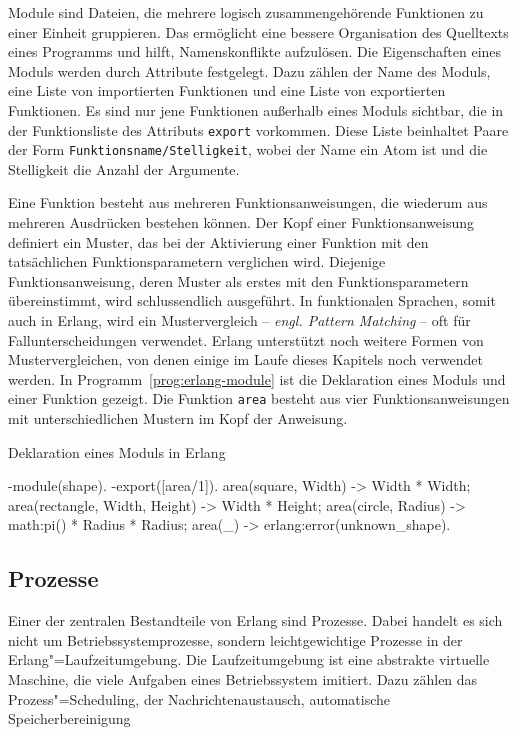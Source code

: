 Module sind Dateien, die mehrere logisch zusammengehörende Funktionen zu einer Einheit gruppieren. Das ermöglicht eine bessere Organisation des Quelltexts eines Programms und hilft, Namenskonflikte aufzulösen. Die Eigenschaften eines Moduls werden durch Attribute festgelegt. Dazu zählen \zB der Name des Moduls, eine Liste von importierten Funktionen und eine Liste von exportierten Funktionen. Es sind nur jene Funktionen außerhalb eines Moduls sichtbar, die in der Funktionsliste des Attributs \lstinline{export} vorkommen. Diese Liste beinhaltet Paare der Form \lstinline{Funktionsname/Stelligkeit}, wobei der Name ein Atom ist und die Stelligkeit die Anzahl der Argumente.

Eine Funktion besteht aus mehreren Funktionsanweisungen, die wiederum aus mehreren Ausdrücken bestehen können. Der Kopf einer Funktionsanweisung definiert ein Muster, das bei der Aktivierung einer Funktion mit den tatsächlichen Funktionsparametern verglichen wird. Diejenige Funktionsanweisung, deren Muster als erstes mit den Funktionsparametern übereinstimmt, wird schlussendlich ausgeführt. In funktionalen Sprachen, somit auch in Erlang, wird ein Mustervergleich -- \textit{engl. Pattern Matching} -- oft für Fallunterscheidungen verwendet. Erlang unterstützt noch weitere Formen von Mustervergleichen, von denen einige im Laufe dieses Kapitels noch verwendet werden. In Programm~\ref{prog:erlang-module} ist die Deklaration eines Moduls und einer Funktion gezeigt. Die Funktion \lstinline{area} besteht aus vier Funktionsanweisungen mit unterschiedlichen Mustern im Kopf der Anweisung.

\begin{program}[!hbt]
\caption{Deklaration eines Moduls in Erlang}
\label{prog:erlang-module}
\begin{ErlangCode}
-module(shape).
-export([area/1]).
area({square, Width}) -> Width * Width;
area({rectangle, Width, Height}) -> Width * Height;
area({circle, Radius}) -> math:pi() * Radius * Radius;
area(_) -> erlang:error(unknown_shape).
\end{ErlangCode}
\end{program}

\subsection{Prozesse}
\label{subsec:erlang-processes}

Einer der zentralen Bestandteile von Erlang sind Prozesse. Dabei handelt es sich nicht um Betriebssystemprozesse, sondern leichtgewichtige Prozesse in der Erlang"=Laufzeitumgebung. Die Laufzeitumgebung ist eine abstrakte virtuelle Maschine, die viele Aufgaben eines Betriebssystem imitiert. Dazu zählen das Prozess"=Scheduling, der Nachrichtenaustausch, automatische Speicherbereinigung \usw

